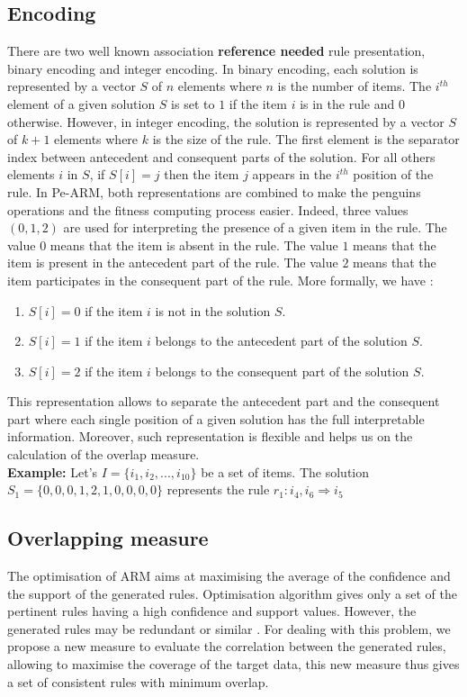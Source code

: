 \documentclass[preprint,12pt]{elsarticle}
\begin{document}
\subsection{Encoding}
There are two well known association \textbf{reference needed} rule presentation, binary encoding and
integer encoding. In binary encoding, each solution is represented
by a vector $S$ of $n$ elements where $n$ is the number of items.
The $i^{th}$ element of a given solution $S$ is set to $1$ if the
item $i$ is in the rule and $0$ otherwise. However, in integer
encoding, the solution is represented by a vector $S$ of $k+1$
elements where $k$ is the size of the rule. The first element is
the separator index between antecedent and consequent parts of the
solution. For all others elements $i$ in $S$, if $S[i] = j$ then
the item $j$ appears in the $i^{th}$ position of the rule. In
Pe-ARM, both representations are combined to make the
penguins operations and the fitness computing process easier. Indeed, three
values $(0,1,2)$ are used for interpreting the presence of a given
item in the rule. The value $0$ means that the item is absent in
the rule. The value $1$ means that the item is present in the
antecedent part of the rule. The value $2$ means that the item
participates in the consequent part
of the rule. More formally, we have :
\begin{enumerate}
    \item $S[i] = 0$ if the item $i$ is not in the solution $S$.
    \item $S[i] = 1$ if the item $i$ belongs to the antecedent part of the solution $S$.
    \item $S[i] = 2$ if the item $i$ belongs to the consequent part of the solution $S$.
\end{enumerate}
This representation allows to separate the antecedent part and the
consequent part where each single position of a given solution has
the full interpretable information. Moreover, such representation
is flexible and helps us on the calculation of the overlap
measure.\\
\textbf{Example:} Let's $I=\{i_1, i_2,..., i_{10}\}$ be a set of items.
The solution $S_1=\{0, 0, 0, 1, 2, 1, 0, 0, 0, 0\}$ represents the
rule $r_1: i_4, i_6 \Rightarrow i_5$

\subsection{Overlapping measure}
The optimisation of ARM aims at maximising the
average of the confidence and the support of the generated
rules. Optimisation algorithm gives only a set of the pertinent
rules having a high confidence and support values. However, the
generated rules may be redundant or similar \cite{27}. For dealing with this
problem, we propose a new measure to evaluate the correlation
between the generated rules, allowing to maximise the coverage of
the target data, this new measure thus gives a set of consistent rules with minimum overlap.
\end{document}
